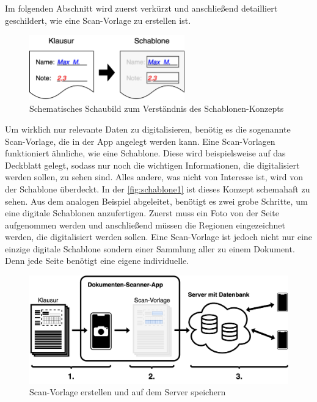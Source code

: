 \documentclass[notables, nomenclature, oneside, 150]{HSMW-Thesis}
\begin{document}
		Im folgenden Abschnitt wird zuerst verkürzt und anschließend detailliert geschildert, wie eine Scan-Vorlage zu erstellen ist.
	
		\begin{figure}[th]
    		\centering
    		\includegraphics[width=0.6\textwidth]{img/schablone1}
    		\caption{Schematisches Schaubild zum Verständnis des Schablonen-Konzepts}
    		\label{fig:schablone1}
    	\end{figure}
    
		Um wirklich nur relevante Daten zu digitalisieren, benötig es die sogenannte Scan-Vorlage, die in der App angelegt werden kann. Eine Scan-Vorlagen funktioniert ähnliche, wie eine Schablone. Diese wird beispielsweise auf das Deckblatt gelegt, sodass nur noch die wichtigen Informationen, die digitalisiert werden sollen, zu sehen sind. Alles andere, was nicht von Interesse ist, wird von der Schablone überdeckt. In der \autoref{fig:schablone1} ist dieses Konzept schemahaft zu sehen. Aus dem analogen Beispiel abgeleitet, benötigt es zwei grobe Schritte, um eine  digitale Schablonen anzufertigen. Zuerst muss ein Foto von der Seite aufgenommen werden und anschließend müssen die Regionen eingezeichnet werden, die digitalisiert werden sollen. Eine Scan-Vorlage ist jedoch nicht nur eine einzige digitale Schablone sondern einer Sammlung aller zu einem Dokument. Denn jede Seite benötigt eine eigene individuelle.
	
		\begin{figure}[th]
    		\centering
    		\includegraphics[width=\textwidth]{img/schema1}
    		\caption{Scan-Vorlage erstellen und auf dem Server speichern}
    		\label{fig:schema1}
    	\end{figure}
	
\end{document}
